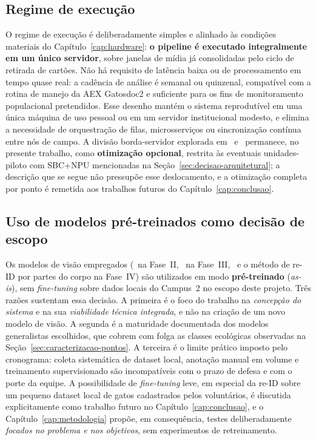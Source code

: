 

\subsection*{Regime de execução}

O regime de execução é deliberadamente simples e alinhado às condições materiais do Capítulo~\ref{cap:hardware}: \textbf{o pipeline é executado integralmente em um único servidor}, sobre janelas de mídia já consolidadas pelo ciclo de retirada de cartões. Não há requisito de latência baixa ou de processamento em tempo quase real: a cadência de análise é semanal ou quinzenal, compatível com a rotina de manejo da AEX Gatosdoc2 e suficiente para os fins de monitoramento populacional pretendidos. Esse desenho mantém o sistema reprodutível em uma única máquina de uso pessoal ou em um servidor institucional modesto, e elimina a necessidade de orquestração de filas, microsserviços ou sincronização contínua entre nós de campo. A divisão borda-servidor explorada em~ e~ permanece, no presente trabalho, como \textbf{otimização opcional}, restrita às eventuais unidades-piloto com SBC+NPU mencionadas na Seção~\ref{sec:decisao-arquitetural}; a descrição que se segue não pressupõe esse deslocamento, e a otimização completa por ponto é remetida aos trabalhos futuros do Capítulo~\ref{cap:conclusao}.

\subsection*{Uso de modelos pré-treinados como decisão de escopo}

Os modelos de visão empregados (\modeloMD~na Fase~II, \modeloSN~na Fase~III, \modeloPetFace~e o método de re-ID por partes do corpo na Fase~IV) são utilizados em modo \textbf{pré-treinado} (\emph{as-is}), sem \emph{fine-tuning} sobre dados locais do Campus~2 no escopo deste projeto. Três razões sustentam essa decisão. A primeira é o foco do trabalho na \emph{concepção do sistema} e na sua \emph{viabilidade técnica integrada}, e não na criação de um novo modelo de visão. A segunda é a maturidade documentada dos modelos generalistas escolhidos, que cobrem com folga as classes ecológicas observadas na Seção~\ref{sec:caracterizacao-pontos}. A terceira é o limite prático imposto pelo cronograma: coleta sistemática de dataset local, anotação manual em volume e treinamento supervisionado são incompatíveis com o prazo de defesa e com o porte da equipe. A possibilidade de \emph{fine-tuning} leve, em especial da re-ID sobre um pequeno dataset local de gatos cadastrados pelos voluntários, é discutida explicitamente como trabalho futuro no Capítulo~\ref{cap:conclusao}, e o Capítulo~\ref{cap:metodologia} propõe, em consequência, testes deliberadamente \emph{focados no problema e nos objetivos}, sem experimentos de retreinamento.
